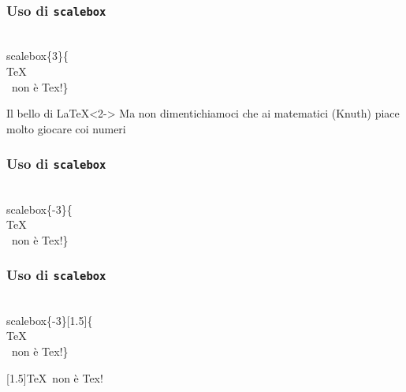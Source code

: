 \documentclass[svgnames,%
	ucs,%
	pdftex]{guitbeamer}
\begin{document}
\begin{frame}
  \frametitle{Uso di \texttt{scalebox}}
	\begin{LaTeXcode}
		\\scalebox\{\alert{3}\}\{\\TeX\\ \ non \`e Tex!\}
	\end{LaTeXcode}
	\begin{block}{}
	  \rmfamily
	\end{block}
  \bigskip
	\begin{block}{Il bello di \LaTeX}<2->
		Ma non dimentichiamoci che ai matematici (Knuth) piace molto giocare coi numeri
	\end{block}
\end{frame}
\begin{frame}
  \frametitle{Uso di \texttt{scalebox}}
	\begin{LaTeXcode}
		\\scalebox\{\alert{-3}\}\{\\TeX\\ \ non \`e Tex!\}
	\end{LaTeXcode}
	\begin{LaTeXoutput}
	\end{LaTeXoutput}
\end{frame}
\begin{frame}
  \frametitle{Uso di \texttt{scalebox}}
	\begin{LaTeXcode}
		\\scalebox\{-3\}\alert{[1.5]}\{\\TeX\\ \ non \`e Tex!\}
	\end{LaTeXcode}
	\begin{LaTeXoutput}
		\scalebox{-3}[1.5]{\TeX\ non \`e Tex!}
	\end{LaTeXoutput}
\end{frame}
\end{document}
